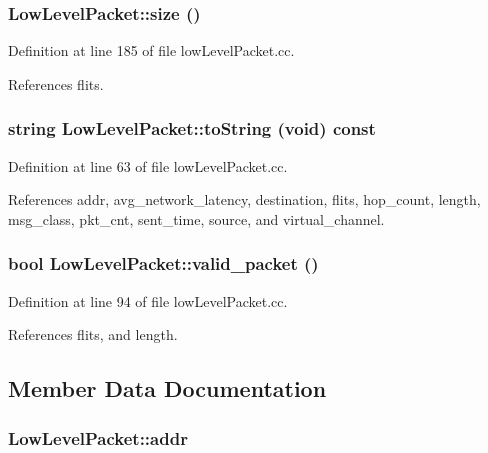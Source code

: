 \subsubsection[{size}]{ LowLevelPacket::size ()}\label{classLowLevelPacket_f61b1051a4dbda237dbeb1bd74220d20}




Definition at line 185 of file lowLevelPacket.cc.

References flits.
\subsubsection[{toString}]{\setlength{\rightskip}{0pt plus 5cm}string LowLevelPacket::toString (void) const}\label{classLowLevelPacket_5a52563bae0560cb9b0b9a6d44adde6c}




Definition at line 63 of file lowLevelPacket.cc.

References addr, avg\_\-network\_\-latency, destination, flits, hop\_\-count, length, msg\_\-class, pkt\_\-cnt, sent\_\-time, source, and virtual\_\-channel.
\subsubsection[{valid\_\-packet}]{\setlength{\rightskip}{0pt plus 5cm}bool LowLevelPacket::valid\_\-packet ()}\label{classLowLevelPacket_1053348a061e1878e90a4f49d383889f}




Definition at line 94 of file lowLevelPacket.cc.

References flits, and length.

\subsection{Member Data Documentation}
\subsubsection[{addr}]{ {\bf LowLevelPacket::addr}}\label{classLowLevelPacket_c7767df59c8c88c21171828b30f2b176}




